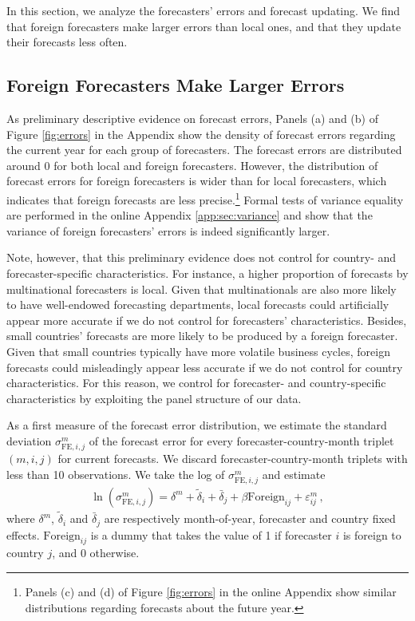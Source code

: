 
In this section, we analyze the forecasters' errors and forecast updating. We find that foreign forecasters make larger errors than local ones, and that they update their forecasts less often.

\subsection{Foreign Forecasters Make Larger Errors}

As preliminary descriptive evidence on forecast errors, Panels (a) and (b) of Figure \ref{fig:errors} in the Appendix show the density of forecast errors regarding the current year for each group of forecasters. The forecast errors are distributed around 0 for both local and foreign forecasters. However, the distribution of forecast errors for foreign forecasters is wider than for local forecasters, which indicates that foreign forecasts are less precise.\footnote{Panels (c) and (d) of Figure \ref{fig:errors} in the online Appendix show similar distributions regarding forecasts about the future year.} Formal tests of variance equality are performed in the online Appendix \ref{app:sec:variance} and show that the variance of foreign forecasters' errors is indeed significantly larger.

Note, however, that this preliminary evidence does not control for country- and forecaster-specific characteristics. For instance, a higher proportion of forecasts by multinational forecasters is local. Given that multinationals are also more likely to have well-endowed forecasting departments, local forecasts could artificially appear more accurate if we do not control for forecasters' characteristics. Besides, small countries' forecasts are more likely to be produced by a foreign forecaster. Given that small countries typically have more volatile business cycles, foreign forecasts could misleadingly appear less accurate if we do not control for country characteristics. For this reason, we control for forecaster- and country-specific characteristics by exploiting the panel structure of our data.

As a first measure of the forecast error distribution, we estimate the standard deviation $\sigma^m_{\text{FE},i,j}$ of the forecast error for every forecaster-country-month triplet $(m,i,j)$ for current forecasts. We discard forecaster-country-month triplets with less than 10 observations. We take the log of $\sigma^m_{\text{FE},i,j}$ and estimate
\begin{align}
	\ln(\sigma^m_{\text{FE},i,j}) =  \delta^m +\tilde\delta_{i} + \bar{\delta}_{j} +
\beta \text{Foreign}_{ij} + \varepsilon_{ij}^m  \,, \label{eq:regModelSE_FE}
\end{align}
where  $ \delta^m $, $\tilde\delta_{i} $ and $\bar{\delta}_{j} $ are respectively month-of-year, forecaster and country fixed effects. $\text{Foreign}_{ij} $ is a dummy that takes the value of 1 if forecaster $i$ is foreign to country $j$, and 0 otherwise.

